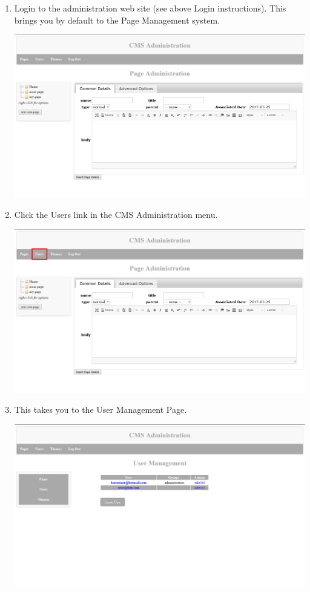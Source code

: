 \documentclass[12pt]{article}
\begin{document}
\begin{enumerate}
  \item Login to the administration web site (see above Login instructions). This brings you by default to the Page Management system.
  
  \includegraphics[width=\textwidth,height=\textheight,keepaspectratio]{pics/createBasicUser_1.png}
  
  \item Click the Users link in the CMS Administration menu.
  
  \includegraphics[width=\textwidth,height=\textheight,keepaspectratio]{pics/createBasicUser_2.png}
  
  \pagebreak
  
  \item This takes you to the User Management Page.
  
  \includegraphics[width=\textwidth,height=\textheight,keepaspectratio]{pics/createBasicUser_3.png}
  

\end{enumerate}
\end{document}
